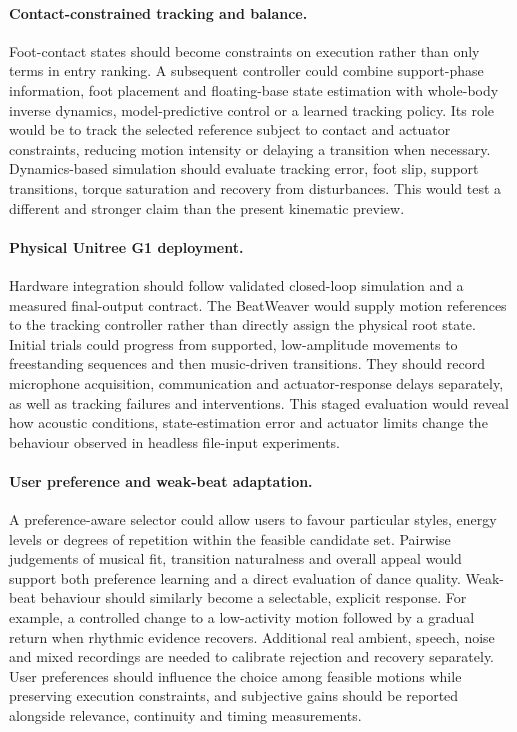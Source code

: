 \paragraph{Contact-constrained tracking and balance.}
Foot-contact states should become constraints on execution rather than only
terms in entry ranking. A subsequent controller could combine support-phase
information, foot placement and floating-base state estimation with whole-body
inverse dynamics, model-predictive control or a learned tracking policy. Its
role would be to track the selected reference subject to contact and actuator
constraints, reducing motion intensity or delaying a transition when necessary.
Dynamics-based simulation should evaluate tracking error, foot slip, support
transitions, torque saturation and recovery from disturbances. This would test
a different and stronger claim than the present kinematic preview.

\paragraph{Physical Unitree G1 deployment.}
Hardware integration should follow validated closed-loop simulation and a
measured final-output contract. The BeatWeaver would supply motion references
to the tracking controller rather than directly assign the physical root state.
Initial trials could progress from supported, low-amplitude movements to
freestanding sequences and then music-driven transitions. They should record
microphone acquisition, communication and actuator-response delays separately,
as well as tracking failures and interventions. This staged evaluation would
reveal how acoustic conditions, state-estimation error and actuator limits
change the behaviour observed in headless file-input experiments.

\paragraph{User preference and weak-beat adaptation.}
A preference-aware selector could allow users to favour particular styles,
energy levels or degrees of repetition within the feasible candidate set.
Pairwise judgements of musical fit, transition naturalness and overall appeal
would support both preference learning and a direct evaluation of dance quality.
Weak-beat behaviour should similarly become a selectable, explicit response.
For example, a controlled change to a low-activity motion followed by a gradual
return when rhythmic evidence recovers. Additional real ambient, speech, noise
and mixed recordings are needed to calibrate rejection and recovery separately.
User preferences should influence the choice among feasible motions while
preserving execution constraints, and subjective gains should be reported
alongside relevance, continuity and timing measurements.

